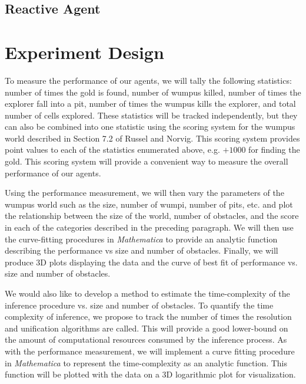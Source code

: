\documentclass{article}
\begin{document}
		\subsection{Reactive Agent}
			
		
		
	\section{Experiment Design}
	
	To measure the performance of our agents, we will tally the following statistics: number of times the gold is found, number of wumpus killed, number of times the explorer fall into a pit, number of times the wumpus kills the explorer, and total number of cells explored. These statistics will be tracked independently, but they can also be combined into one statistic using the scoring system for the wumpus world described in Section 7.2 of Russel and Norvig. This scoring system provides point values to each of the statistics enumerated above, e.g. $+1000$ for finding the gold. This scoring system will provide a convenient way to measure the overall performance of our agents.
	
	Using the performance measurement, we will then vary the parameters of the wumpus world such as the size, number of wumpi, number of pits, etc. and plot the relationship between the size of the world, number of obstacles, and the score in each of the categories described in the preceding paragraph. We will then use the curve-fitting procedures in \textit{Mathematica} to provide an analytic function describing the performance vs size and number of obstacles. Finally, we will produce 3D plots displaying the data and the curve of best fit of performance vs. size and number of obstacles.
	
	We would also like to develop a method to estimate the time-complexity of the inference procedure vs. size and number of obstacles.
	To quantify the time complexity of inference, we propose to track the number of times the resolution and unification algorithms are called. This will provide a good lower-bound on the amount of computational resources consumed by the inference process. As with the performance measurement, we will implement a curve fitting procedure in \textit{Mathematica} to represent the time-complexity as an analytic function. This function will be plotted with the data on a 3D logarithmic plot for visualization.
	
	
	

	




		
	
\end{document}
